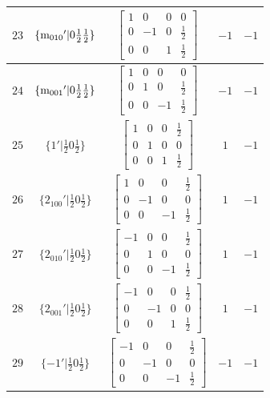 \documentclass[fleqn,8pt]{jsarticle}
\begin{document}
\begin{longtable}{ccccc}
$ 23 $ & $ \{{\rm m}_{010}{}'|0 \frac{1}{2} \frac{1}{2}\} $ & $ \begin{bmatrix} 1 & 0 & 0 & 0 \\ 0 & -1 & 0 & \frac{1}{2} \\ 0 & 0 & 1 & \frac{1}{2} \end{bmatrix} $ & $ -1 $ & $ -1 $ \\ \hline
$ 24 $ & $ \{{\rm m}_{001}{}'|0 \frac{1}{2} \frac{1}{2}\} $ & $ \begin{bmatrix} 1 & 0 & 0 & 0 \\ 0 & 1 & 0 & \frac{1}{2} \\ 0 & 0 & -1 & \frac{1}{2} \end{bmatrix} $ & $ -1 $ & $ -1 $ \\ \hline
$ 25 $ & $ \{1{}'|\frac{1}{2} 0 \frac{1}{2}\} $ & $ \begin{bmatrix} 1 & 0 & 0 & \frac{1}{2} \\ 0 & 1 & 0 & 0 \\ 0 & 0 & 1 & \frac{1}{2} \end{bmatrix} $ & $ 1 $ & $ -1 $ \\ \hline
$ 26 $ & $ \{2{}_{100}{}'|\frac{1}{2} 0 \frac{1}{2}\} $ & $ \begin{bmatrix} 1 & 0 & 0 & \frac{1}{2} \\ 0 & -1 & 0 & 0 \\ 0 & 0 & -1 & \frac{1}{2} \end{bmatrix} $ & $ 1 $ & $ -1 $ \\ \hline
$ 27 $ & $ \{2{}_{010}{}'|\frac{1}{2} 0 \frac{1}{2}\} $ & $ \begin{bmatrix} -1 & 0 & 0 & \frac{1}{2} \\ 0 & 1 & 0 & 0 \\ 0 & 0 & -1 & \frac{1}{2} \end{bmatrix} $ & $ 1 $ & $ -1 $ \\ \hline
$ 28 $ & $ \{2{}_{001}{}'|\frac{1}{2} 0 \frac{1}{2}\} $ & $ \begin{bmatrix} -1 & 0 & 0 & \frac{1}{2} \\ 0 & -1 & 0 & 0 \\ 0 & 0 & 1 & \frac{1}{2} \end{bmatrix} $ & $ 1 $ & $ -1 $ \\ \hline
$ 29 $ & $ \{-1{}'|\frac{1}{2} 0 \frac{1}{2}\} $ & $ \begin{bmatrix} -1 & 0 & 0 & \frac{1}{2} \\ 0 & -1 & 0 & 0 \\ 0 & 0 & -1 & \frac{1}{2} \end{bmatrix} $ & $ -1 $ & $ -1 $ \\ \hline

\end{longtable}
\end{document}
